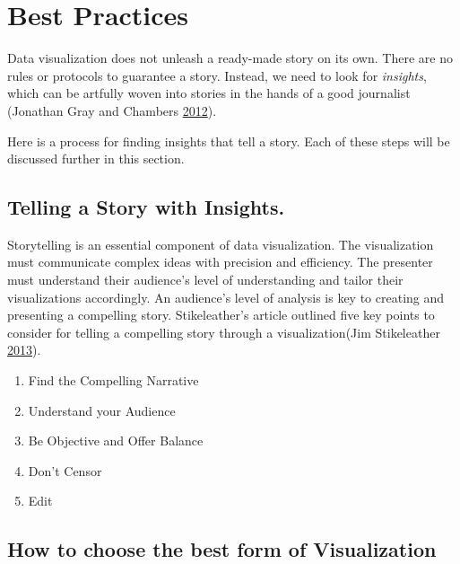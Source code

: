 \documentclass[]{book}
\providecommand{\tightlist}{%
  \setlength{\itemsep}{0pt}\setlength{\parskip}{0pt}}
\begin{document}
\hypertarget{best-practices}{%
\section{Best Practices}\label{best-practices}}

Data visualization does not unleash a ready-made story on its own. There are no rules or protocols to guarantee a story. Instead, we need to look for \emph{insights}, which can be artfully woven into stories in the hands of a good journalist (Jonathan Gray and Chambers \protect\hyperlink{ref-The-Data-Journalism-Handbook}{2012}).

Here is a process for finding insights that tell a story. Each of these steps will be discussed further in this section.

\hypertarget{telling-a-story-with-insights.}{%
\subsection{Telling a Story with Insights.}\label{telling-a-story-with-insights.}}

Storytelling is an essential component of data visualization. The visualization must communicate complex ideas with precision and efficiency. The presenter must understand their audience's level of understanding and tailor their visualizations accordingly. An audience's level of analysis is key to creating and presenting a compelling story. Stikeleather's article outlined five key points to consider for telling a compelling story through a visualization(Jim Stikeleather \protect\hyperlink{ref-storytelling_with_data}{2013}).

\begin{enumerate}
\def\labelenumi{\arabic{enumi}.}
\tightlist
\item
  Find the Compelling Narrative
\item
  Understand your Audience
\item
  Be Objective and Offer Balance
\item
  Don't Censor
\item
  Edit
\end{enumerate}

\hypertarget{how-to-choose-the-best-form-of-visualization}{%
\subsection{How to choose the best form of Visualization}\label{how-to-choose-the-best-form-of-visualization}}
\end{document}
